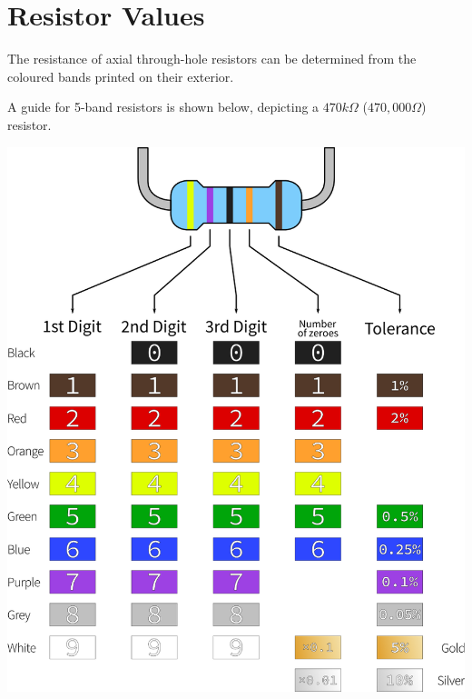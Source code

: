 \section{Resistor Values}

	The resistance of axial through-hole resistors can be determined from the coloured bands printed on their exterior.
	
	A guide for 5-band resistors is shown below, depicting a $470 k\Omega$ ($470,000 \Omega$) resistor.
	
	\begin{center}
		\includegraphics[width=0.7\linewidth]{McrRaspJam/015_GPIOZero/8_resistorbands/5band}
	\end{center}